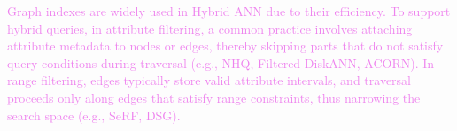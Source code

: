 \documentclass[sigconf, nonacm]{acmart}
\begin{document}
	\textcolor{violet}{Graph indexes are widely used in Hybrid ANN due to their efficiency. To support hybrid queries, in attribute filtering, a common practice involves attaching attribute metadata to nodes or edges, thereby skipping parts that do not satisfy query conditions during traversal (e.g., NHQ, Filtered-DiskANN, ACORN). In range filtering, edges typically store valid attribute intervals, and traversal proceeds only along edges that satisfy range constraints, thus narrowing the search space (e.g., SeRF, DSG).}
	
%	
%	
	
\end{document}
